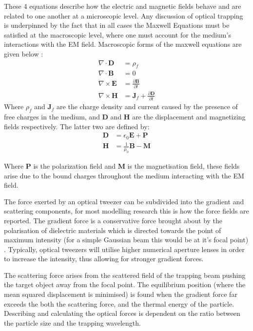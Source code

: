 These 4 equations describe how the electric and magnetic fields behave
and are related to one another at a microscopic level. Any discussion 
of optical trapping is underpinned by the fact that in all cases the 
Maxwell Equations must be satisfied at the macroscopic level, where 
one must account for the medium's interactions with the EM field. 
Macroscopic forms of the maxwell equations are given below \cite{Jackson_1975}:
\begin{align}
	\nabla \cdot \mathbf{D}
	&= \rho_f
	\\
	\nabla \cdot \mathbf{B}
	&= 0
	\\
	\nabla \times \mathbf{E}
	&= \frac{\partial \mathbf{B}}{\partial t}
	\\
	\nabla \times \mathbf{H}
	&= \mathbf{J}_f +\frac{\partial \mathbf{D}}{\partial t}  
\end{align}
Where $\rho_f$ and $\mathbf{J}_f$ are the charge density and current 
caused by the presence of free charges in the medium, and $\mathbf{D}$ 
and $\mathbf{H}$ are the displacement and magnetizing fields respectively. 
The latter two are defined by:
\begin{align}
	\nonumber
	\mathbf{D} &= \epsilon_0\mathbf{E}+\mathbf{P} 
	\\ 
	\nonumber
	\mathbf{H} &= \frac{1}{\mu_0}\mathbf{B}-\mathbf{M}
\end{align}

Where $\mathbf{P}$ is the polarization field and $\mathbf{M}$ is the 
magnetisation field, these fields arise due to the bound charges 
throughout the medium interacting with the EM field. 
 
The force exerted by an optical tweezer can be subdivided into the 
gradient and scattering components, for most modelling research this 
is how the force fields are reported. The gradient force is a conservative 
force brought about by the polarisation of dielectric materials which 
is directed towards the point of maximum intensity (for a simple Gaussian 
beam this would be at it's focal point) \cite{YasuhiroHarada1996}. 
Typically, optical tweezers will utilise higher numerical aperture lenses 
in order to increase the intensity, thus allowing for stronger 
gradient forces.

The scattering force arises from the scattered field of the trapping beam 
pushing the target object away from the focal point. The equilibrium position 
(where the mean squared displacement is minimised) is found when the 
gradient force far exceeds the both the scattering force, and the thermal 
energy of the particle. Describing and calculating the optical forces is 
dependent on the ratio between the particle size and the trapping wavelength. 


